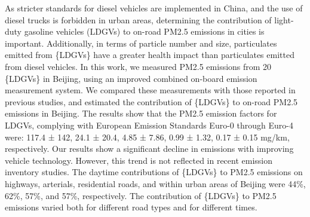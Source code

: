 As stricter standards for diesel vehicles are implemented in China, and the use of diesel trucks is forbidden in urban areas, determining the contribution of light-duty gasoline vehicles (LDGVs) to on-road PM2.5 emissions in cities is important. Additionally, in terms of particle number and size, particulates emitted from \{LDGVs\} have a greater health impact than particulates emitted from diesel vehicles. In this work, we measured PM2.5 emissions from 20 \{LDGVs\} in Beijing, using an improved combined on-board emission measurement system. We compared these measurements with those reported in previous studies, and estimated the contribution of \{LDGVs\} to on-road PM2.5 emissions in Beijing. The results show that the PM2.5 emission factors for LDGVs, complying with European Emission Standards Euro-0 through Euro-4 were: 117.4 ± 142, 24.1 ± 20.4, 4.85 ± 7.86, 0.99 ± 1.32, 0.17 ± 0.15 mg/km, respectively. Our results show a significant decline in emissions with improving vehicle technology. However, this trend is not reflected in recent emission inventory studies. The daytime contributions of \{LDGVs\} to PM2.5 emissions on highways, arterials, residential roads, and within urban areas of Beijing were 44\%, 62\%, 57\%, and 57\%, respectively. The contribution of \{LDGVs\} to PM2.5 emissions varied both for different road types and for different times.